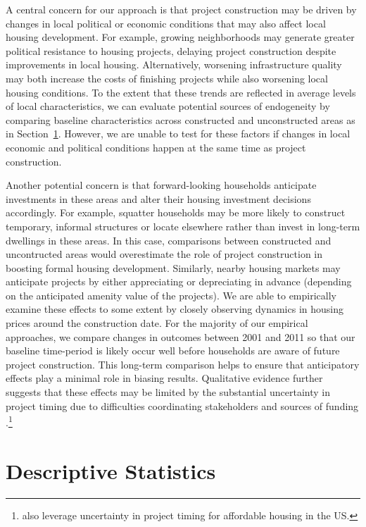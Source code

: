 \documentclass[12pt]{article}
\begin{document}
A central concern for our approach is that project construction may be driven by changes in local political or economic conditions that may also affect local housing development.  For example, growing neighborhoods may generate greater political resistance to housing projects, delaying project construction despite improvements in local housing.  Alternatively, worsening infrastructure quality may both increase the costs of finishing projects while also worsening local housing conditions.  To the extent that these trends are reflected in average levels of local characteristics, we can evaluate potential sources of endogeneity by comparing baseline characteristics across constructed and unconstructed areas as in Section~\ref{section:descriptives}.  However, we are unable to test for these factors if changes in local economic and political conditions happen at the same time as project construction.

Another potential concern is that forward-looking households anticipate investments in these areas and alter their housing investment decisions accordingly.  For example, squatter households may be more likely to construct temporary, informal structures or locate elsewhere rather than invest in long-term dwellings in these areas.  In this case, comparisons between constructed and uncontructed areas would overestimate the role of project construction in boosting formal housing development.  Similarly, nearby housing markets may anticipate projects by either appreciating or depreciating in advance (depending on the anticipated amenity value of the projects).  We are able to empirically examine these effects to some extent by closely observing dynamics in housing prices around the construction date.  For the majority of our empirical approaches, we compare changes in outcomes between 2001 and 2011 so that our baseline time-period is likely occur well before households are aware of future project construction.  This long-term comparison helps to ensure that anticipatory effects play a minimal role in biasing results.  Qualitative evidence further suggests that these effects may be limited by the substantial uncertainty in project timing due to difficulties coordinating stakeholders and sources of funding \citep{serihistory}.\footnote{\cite{diamond2016wants} also leverage uncertainty in project timing for affordable housing in the US.}


\section{Descriptive Statistics}\label{section:descriptives}
\end{document}
